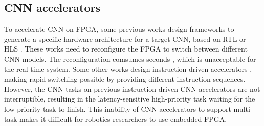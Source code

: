 \subsection{ CNN accelerators }

To accelerate CNN on FPGA, some previous works design frameworks to generate a specific hardware architecture for a target CNN, based on  RTL \cite{li_high_2016} or HLS \cite{lu_evaluating_2017}. These works need to reconfigure the FPGA to switch between different CNN models. The reconfiguration comsumes seconds \cite{FPGAPerformance}, which is unacceptable for the real time system.
Some other works design instruction-driven accelerators \cite{yu2018instruction,qiu2016going,guo2017angel,dpu}, making rapid switching possible by providing different instruction sequences. 
However, the CNN tasks on previous instruction-driven CNN accelerators are not interruptible, resulting in the latency-sensitive high-priority task waiting for the low-priority task to finish. 
This inability of CNN accelerators to support multi-task makes it difficult for robotics researchers to use embedded FPGA.

